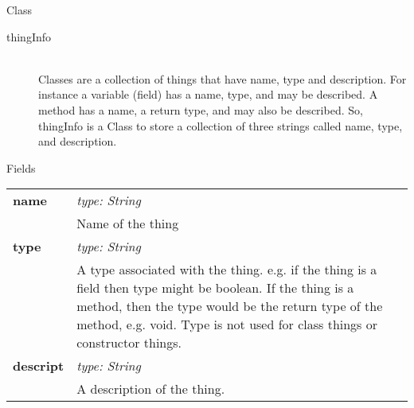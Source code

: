 \documentclass[11pt,a4paper]{article}
\newcommand \bt{\begin{longtable}{p{0.25\textwidth}p{0.74\textwidth}}}
\newcommand \et{\end{longtable}}
\newcommand{\hs}{\hspace{0.5cm}}
\newenvironment{di}
{\begin{flushright}
\begin{minipage}{0.95\textwidth}
\begin{description}
}
{\end{description}
\end{minipage}
\end{flushright}
}
\begin{document}
\noindent
\colorbox{classbg}{\parbox{1.0\textwidth}{\Large{Class}}}
\begin{di}
\item[\large{thingInfo}]\qquad\\
Classes are a collection of things that have name, type and description. For instance a variable (field) has a name, type, and may be described. A method has a name, a return type, and may also be described. So, thingInfo is a Class to store a collection of three strings called name, type, and description.
\end{di}
\colorbox{fieldbg}{\parbox{1.0\textwidth}{\Large{Fields}}}\vspace{0.5cm}
\bt
\hs \textbf{name} & \emph{type: String}\\
& \hs Name of the thing\\
\hs \textbf{type} & \emph{type: String}\\
& \hs A type associated with the thing. e.g. if the thing is a field then type might be boolean. If the thing is a method, then the type would be the return type of the method, e.g. void. Type is not used for class things or constructor things.\\
\hs \textbf{descript} & \emph{type: String}\\
& \hs A description of the thing.\\
\et
\end{document}
